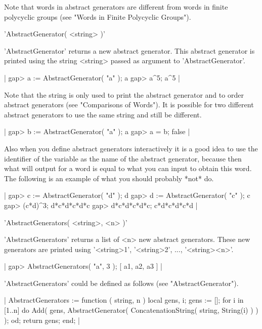 Note that words in abstract generators are different from words in finite
polycyclic groups (see "Words in Finite Polycyclic Groups").


'AbstractGenerator( <string> )'

'AbstractGenerator'  returns  a  new  abstract generator.   This abstract
generator  is  printed  using  the string <string> passed as  argument to
'AbstractGenerator'.

|    gap> a := AbstractGenerator( "a" );
    a
    gap> a^5;
    a^5 |

Note that the string is only used to  print the abstract generator and to
order abstract  generators (see "Comparisons of  Words").  It is possible
for two different abstract generators to use the same string and still be
different.

|    gap> b := AbstractGenerator( "a" );
    a
    gap> a = b;
    false |

Also when you define abstract generators interactively it is a  good idea
to  use  the identifier of  the  variable  as  the  name of  the abstract
generator, because then what {\GAP} will  output for  a word is  equal to
what  you can  input to obtain this word.  The following is an example of
what you should probably *not* do.

|    gap> c := AbstractGenerator( "d" );
    d
    gap> d := AbstractGenerator( "c" );
    c
    gap> (c*d)^3;
    d*c*d*c*d*c
    gap> d*c*d*c*d*c;
    c*d*c*d*c*d |


'AbstractGenerators( <string>, <n> )'

'AbstractGenerators'  returns  a list  of  <n>  new abstract  generators.
These new  generators are  printed  using '<string>1', '<string>2',  ...,
'<string><n>'.

|    gap> AbstractGenerators( "a", 3 );
    [ a1, a2, a3 ] |

'AbstractGenerators'    could     be    defined    as    follows     (see
"AbstractGenerator").

|    AbstractGenerators := function ( string, n )
        local   gens, i;
        gens := [];
        for i  in [1..n]  do
            Add( gens,
                 AbstractGenerator(
                     ConcatenationString( string, String(i) ) ) );
        od;
        return gens;
    end; |

